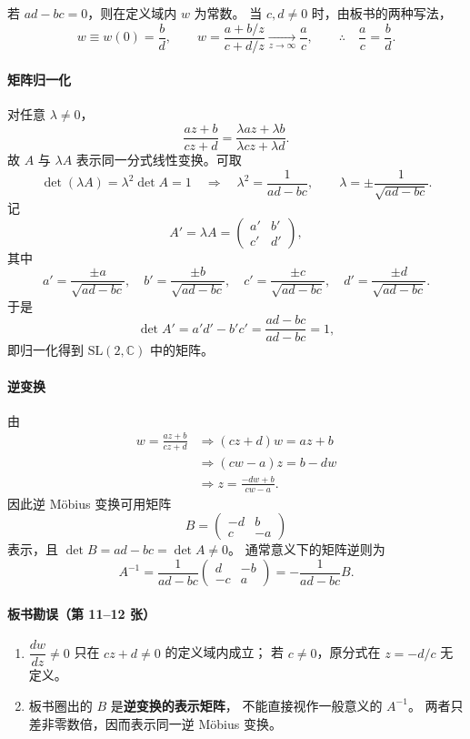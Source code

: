若 $ad-bc=0$，则在定义域内 $w$ 为常数。
当 $c,d\ne0$ 时，由板书的两种写法，
\[
  w\equiv w(0)=\frac bd,\qquad
  w=\frac{a+b/z}{c+d/z}\xrightarrow[z\to\infty]{}\frac ac,
  \qquad\therefore\quad\frac ac=\frac bd.
\]

\paragraph{矩阵归一化}
对任意 $\lambda\ne0$，
\[
  \frac{az+b}{cz+d}
  =\frac{\lambda az+\lambda b}{\lambda cz+\lambda d}.
\]
故 $A$ 与 $\lambda A$ 表示同一分式线性变换。可取
\[
  \det(\lambda A)=\lambda^2\det A=1
  \quad\Longrightarrow\quad
  \lambda^2=\frac1{ad-bc},\qquad
  \lambda=\pm\frac1{\sqrt{ad-bc}}.
\]
记
\[
  A'=\lambda A
  =\begin{pmatrix}a'&b'\\c'&d'\end{pmatrix},
\]
其中
\[
  a'=\frac{\pm a}{\sqrt{ad-bc}},\quad
  b'=\frac{\pm b}{\sqrt{ad-bc}},\quad
  c'=\frac{\pm c}{\sqrt{ad-bc}},\quad
  d'=\frac{\pm d}{\sqrt{ad-bc}}.
\]
于是
\[
  \det A'=a'd'-b'c'=\frac{ad-bc}{ad-bc}=1,
\]
即归一化得到 $\mathrm{SL}(2,\mathbb C)$ 中的矩阵。

\paragraph{逆变换}
由
\begin{align*}
  w=\frac{az+b}{cz+d}
  &\Longrightarrow(cz+d)w=az+b\\
  &\Longrightarrow(cw-a)z=b-dw\\
  &\Longrightarrow
  z=\frac{-dw+b}{cw-a}.
\end{align*}
因此逆 Möbius 变换可用矩阵
\[
  B=\begin{pmatrix}-d&b\\c&-a\end{pmatrix}
\]
表示，且 $\det B=ad-bc=\det A\ne0$。
通常意义下的矩阵逆则为
\[
  A^{-1}=\frac1{ad-bc}
  \begin{pmatrix}d&-b\\-c&a\end{pmatrix}
  =-\frac1{ad-bc}B.
\]

\paragraph{板书勘误（第 11--12 张）}
\begin{enumerate}
\item $\dfrac{dw}{dz}\ne0$ 只在 $cz+d\ne0$ 的定义域内成立；
若 $c\ne0$，原分式在 $z=-d/c$ 无定义。
\item 板书圈出的 $B$ 是\textbf{逆变换的表示矩阵}，
不能直接视作一般意义的 $A^{-1}$。
两者只差非零数倍，因而表示同一逆 Möbius 变换。
\end{enumerate}


